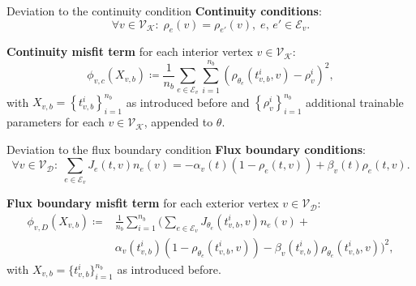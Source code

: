 \documentclass[9pt]{beamer}
\begin{document}
\begin{frame}{Deviation to the continuity condition}
    \textbf{Continuity conditions}:
    \begin{equation*}
        \forall v \in \mathcal{V}_\mathcal{K} \colon \; \rho_e \left( v \right)  = \rho_{e'} \left( v \right), \; e,\,e' \in \mathcal{E}_v.
    \end{equation*}

    \vspace{3mm}

    \textbf{Continuity misfit term} for each interior vertex $v \in \mathcal{V}_{\mathcal{K}}$:
    \begin{equation*} 
        \phi_{v,c}  \left( X_{v,b} \right) \coloneqq \frac{1}{n_b} \sum_{e \in \mathcal{E}_v} \sum_{i=1}^{n_b} \left(  \rho_{\theta_e}  \left( t_{v,b}^i, v \right) - \rho_{v}^i \right)^2,
    \end{equation*} 
    with $X_{v,b} = \left\{ t_{v,b}^i \right\}_{i=1}^{n_b}$ as introduced before and $\left\{ \rho_{v}^i \right\}_{i=1}^{n_b}$ additional trainable parameters for each $v \in \mathcal{V}_{\mathcal{K}}$, appended to $\theta$.
\end{frame}



\begin{frame}{Deviation to the flux boundary condition}
    \textbf{Flux boundary conditions}:
    \begin{equation*}
        \forall v \in \mathcal{V}_\mathcal{D} \colon \; \sum_{e\in \mathcal{E}_v}J_e \left( t, v \right)  n_e  \left( v \right) =-\alpha_v \left( t \right)   \left( 1-\rho_e \left(t, v \right) \right)  + \beta_v \left( t \right)  \rho_e \left(t, v \right).
    \end{equation*}

    \vspace{3mm}

    \textbf{Flux boundary misfit term} for each exterior vertex $v \in \mathcal{V}_{\mathcal{D}}$:
    \begin{equation*}
        \begin{aligned} 
            \phi_{v,D}  \left( X_{v,b} \right) \coloneqq & \frac{1}{n_b} \sum_{i=1}^{n_b} \bigg( \sum_{e \in \mathcal{E}_v} J_{\theta_e}\left( t_{v,b}^i, v \right) n_e  \left( v \right) + \\
            & \alpha_v \left( t_{v,b}^i \right)  \left( 1- \rho_{\theta_e}  \left( t_{v,b}^i, v \right) \right) - \beta_v \left( t_{v,b}^i \right) \rho_{\theta_e}  \left( t_{v,b}^i, v \right) \bigg)^2,
        \end{aligned}
    \end{equation*}
    with $X_{v,b} = \{t_{v,b}^i\}_{i=1}^{n_b}$ as introduced before.
\end{frame}
\end{document}
